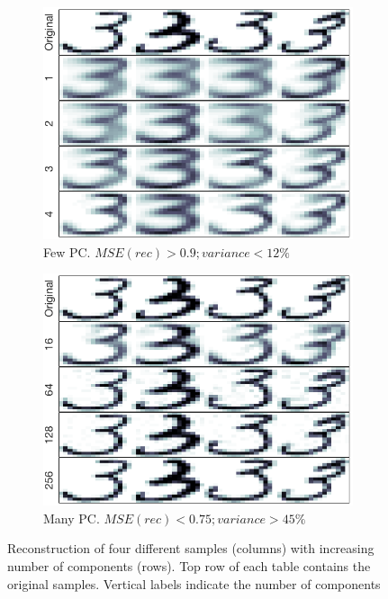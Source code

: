 \documentclass[a4paper, 10pt]{article}
\begin{document}
  \begin{figure}[h]
    \centering
    \begin{subfigure}[t]{0.49\linewidth}
      \includegraphics[width=1\linewidth]{./lab3/PCA/mosaics/PC_1_4_small.png}
      \caption{Few PC. $MSE(rec) > 0.9; variance < 12\%$}
      \label{fig:few_pc}
    \end{subfigure}
    \begin{subfigure}[t]{0.49\linewidth}
      \includegraphics[width=1\linewidth]{./lab3/PCA/mosaics/PC_16_256_small.png}
      \caption{Many PC. $MSE(rec) < 0.75; variance > 45\%$}
      \label{fig:many_pc}
    \end{subfigure}
    \caption{Reconstruction of four different samples (columns) with increasing
      number of components (rows). Top row of each table contains the 
    original samples. Vertical labels indicate the number of components}
    \label{fig:threes_pc}
  \end{figure}
\end{document}

